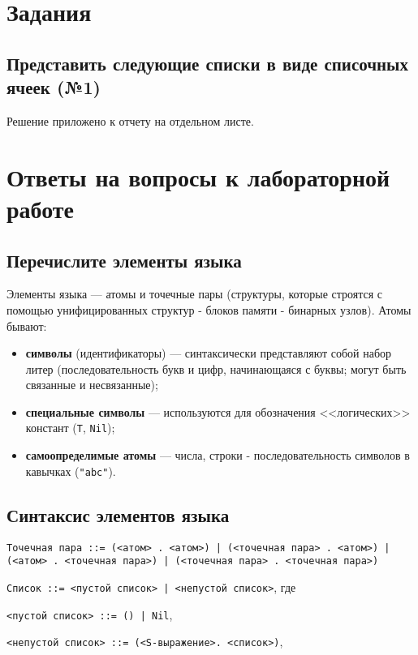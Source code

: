 \chapter{Задания}

\section{Представить следующие списки в виде списочных ячеек (№1)}

Решение приложено к отчету на отдельном листе.

\clearpage

\chapter{Ответы на вопросы к лабораторной работе}

\section{Перечислите элементы языка}

Элементы языка --- атомы и точечные пары (структуры, которые строятся с помощью унифицированных структур - блоков памяти - бинарных узлов). Атомы бывают:
\begin{itemize}
    \item \textbf{символы} (идентификаторы) --- синтаксически представляют собой набор литер (последовательность букв и цифр, начинающаяся с буквы; могут быть связанные и несвязанные);
    \item \textbf{специальные символы} --- используются для обозначения <<логических>> констант (\texttt{T}, \texttt{Nil});
    \item \textbf{самоопределимые атомы} --- числа, строки - последовательность символов в кавычках (\texttt{"abc"}).
\end{itemize}

\section{Синтаксис элементов языка}

\texttt{Точечная пара ::= (<атом> . <атом>) | (<точечная пара> . <атом>) | (<атом> . <точечная пара>) | (<точечная пара> . <точечная пара>)}

\texttt{Список ::= <пустой список> | <непустой список>}, где 

\texttt{<пустой список> ::= () | Nil},

\texttt{<непустой список> ::= (<S-выражение>. <список>)},

